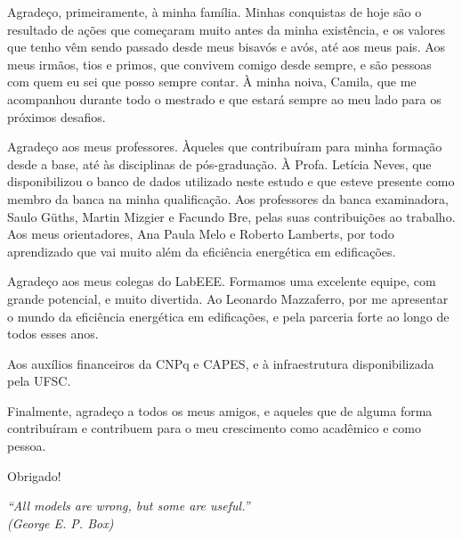 
\begin{agradecimentos}
	Agradeço, primeiramente, à minha família.
	Minhas conquistas de hoje são o resultado de ações que começaram muito antes da minha existência, e os valores que tenho vêm sendo passado desde meus bisavós e avós, até aos meus pais.
	Aos meus irmãos, tios e primos, que convivem comigo desde sempre, e são pessoas com quem eu sei que posso sempre contar.
	À minha noiva, Camila, que me acompanhou durante todo o mestrado e que estará sempre ao meu lado para os próximos desafios.
	
	Agradeço aos meus professores. Àqueles que contribuíram para minha formação desde a base, até às disciplinas de pós-graduação. 
	À Profa. Letícia Neves, que disponibilizou o banco de dados utilizado neste estudo e que esteve presente como membro da banca na minha qualificação.
	Aos professores da banca examinadora, Saulo Güths, Martin Mizgier e Facundo Bre, pelas suas contribuições ao trabalho.
	Aos meus orientadores, Ana Paula Melo e Roberto Lamberts, por todo aprendizado que vai muito além da eficiência energética em edificações.
	
	Agradeço aos meus colegas do LabEEE. Formamos uma excelente equipe, com grande potencial, e muito divertida.
	Ao Leonardo Mazzaferro, por me apresentar o mundo da eficiência energética em edificações, e pela parceria forte ao longo de todos esses anos.
	
	Aos auxílios financeiros da CNPq e CAPES, e à infraestrutura disponibilizada pela UFSC.
	
	Finalmente, agradeço a todos os meus amigos, e aqueles que de alguma forma contribuíram e contribuem para o meu crescimento como acadêmico e como pessoa.
	
	Obrigado!
\end{agradecimentos}

\begin{epigrafe}
	\vspace*{\fill}
	\begin{flushright}
		\textit{``All models are wrong, but some are useful.''\\
			(George E. P. Box)}
	\end{flushright}
\end{epigrafe}

